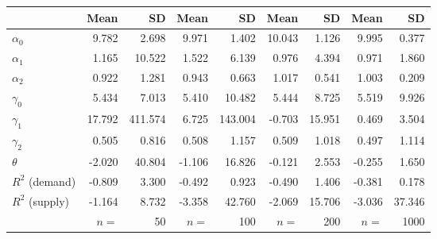 
\begin{tabular}[t]{lrrrrrrrr}
\toprule
  & Mean & SD & Mean  & SD  & Mean   & SD   & Mean    & SD   \\
\midrule
$\alpha_{0}$ & 9.782 & 2.698 & 9.971 & 1.402 & 10.043 & 1.126 & 9.995 & 0.377\\
$\alpha_{1}$ & 1.165 & 10.522 & 1.522 & 6.139 & 0.976 & 4.394 & 0.971 & 1.860\\
$\alpha_{2}$ & 0.922 & 1.281 & 0.943 & 0.663 & 1.017 & 0.541 & 1.003 & 0.209\\
$\gamma_{0}$ & 5.434 & 7.013 & 5.410 & 10.482 & 5.444 & 8.725 & 5.519 & 9.926\\
$\gamma_{1}$ & 17.792 & 411.574 & 6.725 & 143.004 & -0.703 & 15.951 & 0.469 & 3.504\\
$\gamma_{2}$ & 0.505 & 0.816 & 0.508 & 1.157 & 0.509 & 1.018 & 0.497 & 1.114\\
$\theta$ & -2.020 & 40.804 & -1.106 & 16.826 & -0.121 & 2.553 & -0.255 & 1.650\\
$R^{2}$ (demand) & -0.809 & 3.300 & -0.492 & 0.923 & -0.490 & 1.406 & -0.381 & 0.178\\
$R^{2}$ (supply) & -1.164 & 8.732 & -3.358 & 42.760 & -2.069 & 15.706 & -3.036 & 37.346\\
 & $n =$ & 50 & $n =$ & 100 & $n =$ & 200 & $n =$ & 1000\\
\bottomrule
\end{tabular}
